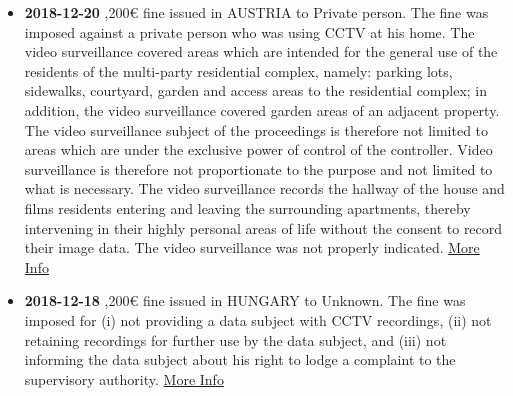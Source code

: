 \documentclass[12pt]{article}
\begin{document}
\newpage
\justify
	\begin{multicols}{2}
		\begin{itemize}
			\item \textbf{2018-12-20} ,200€ fine issued in AUSTRIA to Private person.
			\newline
			The fine was imposed against a private person who was using CCTV at his home. The video surveillance covered areas which are intended for the general use of the residents of the multi-party residential complex, namely: parking lots, sidewalks, courtyard, garden and access areas to the residential complex; in addition, the video surveillance covered garden areas of an adjacent property. The video surveillance subject of the proceedings is therefore not limited to areas which are under the exclusive power of control of the controller. Video surveillance is therefore not proportionate to the purpose and not limited to what is necessary. The video surveillance records the hallway of the house and films residents entering and leaving the surrounding apartments, thereby intervening in their highly personal areas of life without the consent to record their image data. The video surveillance was not properly indicated.
			\newline
			\href{https://www.ris.bka.gv.at/Dokumente/Dsk/DSBT_20181220_DSB_D550_037_0003_DSB_2018_00/DSBT_20181220_DSB_D550_037_0003_DSB_2018_00.pdf}{More Info}
			\vspace{1cm}
	
			\item \textbf{2018-12-18} ,200€ fine issued in HUNGARY to Unknown.
			\newline
			The fine was imposed for (i) not providing a data subject with CCTV recordings, (ii) not retaining recordings for further use by the data subject, and (iii) not informing the data subject about his right to lodge a complaint to the supervisory authority.
			\newline
			\href{https://www.naih.hu/files/NAIH-2018-5559-H-hatarozat.pdf}{More Info}
			\vspace{1cm}
	

\end{itemize}
\end{multicols}
\end{document}
